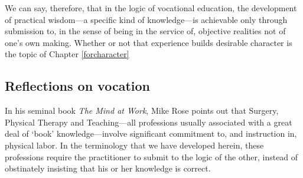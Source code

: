 We can say, therefore, that in the logic of vocational education, the development of practical wisdom---a specific kind of knowledge---is achievable only through submission to, in the sense of being in the service of, objective realities not of one's own making. Whether or not that experience builds desirable character is the topic of Chapter \ref{forcharacter}

\subsection{Reflections on vocation}
\label{reflectionsonvocation}

In his seminal book \emph{The Mind at Work}, Mike Rose points out that Surgery, Physical Therapy and Teaching---all professions usually associated with a great deal of `book' knowledge---involve significant commitment to, and instruction in, physical labor. In the terminology that we have developed herein, these professions require the practitioner to submit to the logic of the other, instead of obstinately insisting that his or her knowledge is correct.

